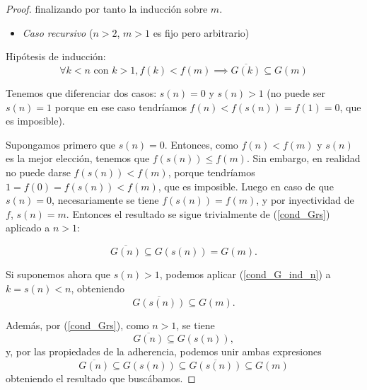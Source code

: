 \documentclass{article}
\newcommand{\refpep}[1]{(\ref{#1})}
\begin{document}
\begin{proof}
finalizando por tanto la inducción sobre $m$.

\begin{itemize}
  \item \textit{Caso recursivo} ($n > 2$, $m>1$ es fijo pero arbitrario)
\end{itemize}

Hipótesis de inducción:
\begin{equation} \label{cond_G_ind_n}
  \forall k < n \text{ con } k > 1, f(k) < f(m) \implies \overline{G(k)} \subseteq G(m)
\end{equation}

Tenemos que diferenciar dos casos: $s(n) = 0$ y $s(n) > 1$ (no puede ser $s(n) = 1$ porque en ese caso tendríamos $f(n) < f(s(n)) = f(1) = 0$, que es imposible).

Supongamos primero que $s(n) = 0$. Entonces, como $f(n) < f(m)$ y $s(n)$ es la mejor elección, tenemos que $f(s(n)) \leq f(m)$. Sin embargo, en realidad no puede darse $f(s(n)) < f(m)$, porque tendríamos $1 = f(0) = f(s(n)) < f(m)$, que es imposible. Luego en caso de que $s(n)=0$, necesariamente se tiene $f(s(n)) = f(m)$, y por inyectividad de $f$, $s(n) = m$. Entonces el resultado se sigue trivialmente de \refpep{cond_Grs} aplicado a $n>1$:

$$
  \overline{G(n)} \subseteq G(s(n)) = G(m).
$$

Si suponemos ahora que $s(n)>1$, podemos aplicar \refpep{cond_G_ind_n} a $k = s(n) < n$, obteniendo $$\overline{G(s(n))} \subseteq G(m).$$

Además, por \refpep{cond_Grs}, como $n > 1$, se tiene $$\overline{G(n)} \subseteq G(s(n)),$$ y, por las propiedades de la adherencia, podemos unir ambas expresiones $$\overline{G(n)} \subseteq G(s(n)) \subseteq \overline{G(s(n))} \subseteq G(m)$$ obteniendo el resultado que buscábamos.


\end{proof}




\end{document}
